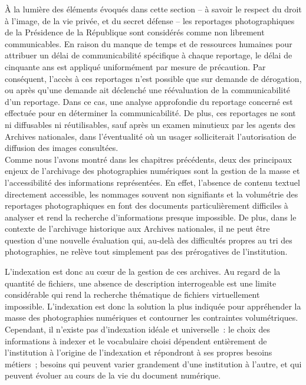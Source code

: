 À la lumière des éléments évoqués dans cette section -- à savoir le respect du droit à l'image,  de la vie privée,  et du secret défense -- les reportages photographiques de la Présidence de la République sont considérés comme non librement communicables. En raison du manque de temps et de ressources humaines pour attribuer un délai de communicabilité spécifique à chaque reportage, le délai de cinquante ans est appliqué uniformément par mesure de précaution. Par conséquent, l'accès à ces reportages n'est possible que sur demande de dérogation, ou après qu'une demande ait déclenché une réévaluation de la communicabilité d'un reportage. Dans ce cas, une analyse approfondie du reportage concerné est effectuée pour en déterminer la communicabilité. De plus, ces reportages ne sont ni diffusables ni réutilisables, sauf après un examen minutieux par les agents des Archives nationales, dans l'éventualité où un usager solliciterait l'autorisation de diffusion des images consultées.
\\

Comme nous l’avons montré dans les chapitres précédents, deux des principaux enjeux de l’archivage des photographies numériques sont la gestion de la masse et l’accessibilité des informations représentées. En effet, l’absence de contenu textuel directement accessible, les nommages souvent non signifiants et la volumétrie des reportages photographiques en font des documents particulièrement difficiles à analyser et rend la recherche d’informations presque impossible. De plus, dans le contexte de l’archivage historique aux Archives nationales, il ne peut être question d’une nouvelle évaluation qui, au-delà des difficultés propres au tri des photographies, ne relève tout simplement pas des prérogatives de l’institution. 

L’indexation est donc au c\oe{}ur de la gestion de ces archives. Au regard de la quantité de fichiers, une absence de description interrogeable est une limite considérable qui rend la recherche thématique de fichiers virtuellement impossible. L’indexation est donc la solution la plus indiquée pour appréhender la masse des photographies numériques et contourner les contraintes volumétriques. Cependant, il n’existe pas d’indexation idéale et universelle : le choix des informations à indexer et le vocabulaire choisi  dépendent entièrement de l’institution à l’origine de l’indexation et répondront à ses propres besoins métiers ; besoins qui peuvent varier grandement d’une institution à l’autre, et qui peuvent évoluer au cours de la vie du document numérique. 
